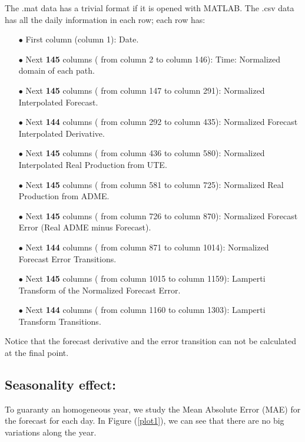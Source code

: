 \documentclass[12pt]{article}
\theoremstyle{definition}
\theoremstyle{remark}
\begin{document}
The .mat data has a trivial format if it is opened with MATLAB. The .csv data has all the daily information in each row; each row has:
\begin{enumerate}
\item[$\bullet$] First column ({\color{blue}column 1}): {\color{red}Date}.
\item[$\bullet$] Next \textbf{145} columns ({\color{blue} from column 2 to column 146}): {\color{red}Time: Normalized domain of each path}.
\item[$\bullet$] Next \textbf{145} columns ({\color{blue} from column 147 to column 291}): {\color{red}Normalized Interpolated Forecast}.
\item[$\bullet$] Next \textbf{144} columns ({\color{blue} from column 292 to column 435}): {\color{red}Normalized Forecast Interpolated Derivative}.
\item[$\bullet$] Next \textbf{145} columns ({\color{blue} from column 436 to column 580}): {\color{red}Normalized Interpolated Real Production from UTE}.
\item[$\bullet$] Next \textbf{145} columns ({\color{blue} from column 581 to column 725}): {\color{red}Normalized Real Production from ADME}.
\item[$\bullet$] Next \textbf{145} columns ({\color{blue} from column 726 to column 870}): {\color{red}Normalized Forecast Error (Real ADME minus Forecast)}.
\item[$\bullet$] Next \textbf{144} columns ({\color{blue} from column 871 to column 1014}): {\color{red}Normalized Forecast Error Transitions}.
\item[$\bullet$] Next \textbf{145} columns ({\color{blue} from column 1015 to column 1159}): {\color{red}Lamperti Transform of the Normalized Forecast Error}.
\item[$\bullet$] Next \textbf{144} columns ({\color{blue} from column 1160 to column 1303}): {\color{red}Lamperti Transform Transitions}.


\end{enumerate}
Notice that the forecast derivative and the error transition can not be calculated at the final point.

\pagebreak 

\subsection*{Seasonality effect:}

To guaranty an homogeneous year, we study the Mean Absolute Error (MAE) for the forecast for each day. In Figure (\ref{plot1}), we can see that there are no big variations along the year.
\end{document}
